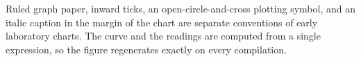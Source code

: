 \documentclass[11pt]{article}
\begin{document}
\vspace{.2em}
\footnotesize\noindent
Ruled graph paper, inward ticks, an open-circle-and-cross plotting symbol, and
an italic caption in the margin of the chart are separate conventions of
early laboratory charts. The curve and the readings are computed from a single
expression, so the figure regenerates exactly on every compilation.
\end{document}
